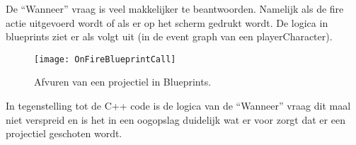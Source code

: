 De “Wanneer” vraag is veel makkelijker te beantwoorden. Namelijk als de fire actie uitgevoerd wordt of als er op het scherm gedrukt wordt. De logica in blueprints ziet er als volgt uit (in de event graph van een playerCharacter).

\begin{figure}[!ht]
  \centering
    \texttt{[image: OnFireBlueprintCall]}
    \caption{Afvuren van een projectiel in Blueprints.}
\end{figure}

In tegenstelling tot de C++ code is de logica van de “Wanneer” vraag dit maal niet verspreid en is het in een oogopslag duidelijk wat er voor zorgt dat er een projectiel geschoten wordt.